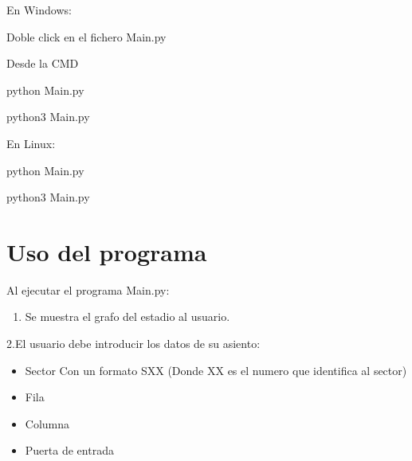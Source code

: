 \documentclass[letterpaper,10pt,spanish]{sphinxmanual}
\begin{document}
\sphinxAtStartPar
En Windows:

\sphinxAtStartPar
Doble click en el fichero Main.py

\sphinxAtStartPar
Desde la CMD

\begin{sphinxVerbatim}[commandchars=\\\{\}]
\PYGZdl{} python Main.py
\end{sphinxVerbatim}

\begin{sphinxVerbatim}[commandchars=\\\{\}]
\PYGZdl{} python3 Main.py
\end{sphinxVerbatim}

\sphinxAtStartPar
En Linux:

\begin{sphinxVerbatim}[commandchars=\\\{\}]
\PYGZdl{} python Main.py
\end{sphinxVerbatim}

\begin{sphinxVerbatim}[commandchars=\\\{\}]
\PYGZdl{} python3 Main.py
\end{sphinxVerbatim}


\section{Uso del programa}
\label{\detokenize{Introduccion:uso-del-programa}}
\sphinxAtStartPar
Al ejecutar el programa Main.py:
\begin{enumerate}
%
\item {} 
\sphinxAtStartPar
Se muestra el grafo del estadio al usuario.

\end{enumerate}

\sphinxAtStartPar
2.El usuario debe introducir los datos de su asiento:
\begin{itemize}
\item {} 
\sphinxAtStartPar
Sector \sphinxhyphen{} Con un formato SXX (Donde XX es el numero que identifica al sector)

\item {} 
\sphinxAtStartPar
Fila

\item {} 
\sphinxAtStartPar
Columna

\item {} 
\sphinxAtStartPar
Puerta de entrada

\end{itemize}
\end{document}

